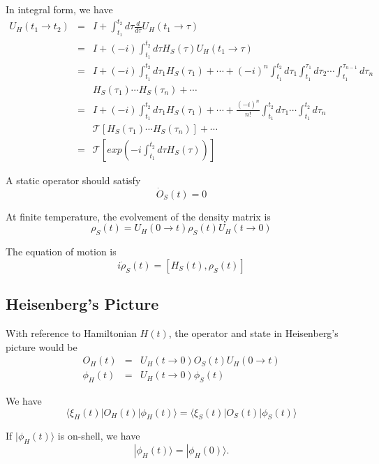 \documentclass[12pt]{book}
\begin{document}
	In integral form, we have
	\begin{eqnarray}
		U_H(t_1\rightarrow t_2)&=& I+\int_{t_1}^{t_2}d\tau\frac d {d\tau} U_H(t_1\rightarrow \tau)\\
		&=& I+(-i)\int_{t_1}^{t_2}d\tau H_S(\tau)U_H(t_1\rightarrow \tau)\\
		&=&I+(-i)\int_{t_1}^{t_2}d\tau_1 H_S(\tau_1)+\cdots+(-i)^n\int_{t_1}^{t_2}d\tau_1\int_{t_1}^{\tau_1}d\tau_2 \cdots\int_{t_1}^{\tau_{n-1}}d\tau_n\nonumber\\
		&& H_S(\tau_1)\cdots H_S(\tau_n)+\cdots\\
		&=&I+(-i)\int_{t_1}^{t_2}d\tau_1 H_S(\tau_1)+\cdots+\frac{(-i)^n}{n!}\int_{t_1}^{t_2}d\tau_1 \cdots\int_{t_1}^{t_2}d\tau_n\nonumber\\
		&& \mathcal T[H_S(\tau_1)\cdots H_S(\tau_n)]+\cdots\\
		&=&\mathcal T[exp(-i\int_{t_1}^{t_2}d\tau H_S(\tau))]
	\end{eqnarray}
	
	A static operator should satisfy
	\begin{equation}
		\dot O_S(t)=0
	\end{equation}	
	
	At finite temperature, the evolvement of the density matrix is
	\begin{equation}
		\rho_S(t)=U_H(0\rightarrow t)\rho_S(t)U_H(t\rightarrow 0)
	\end{equation}
	
	The equation of motion is
	\begin{equation}
		i\dot\rho_S(t)=[H_S(t),\rho_S(t)]
	\end{equation}
	
	\subsection{Heisenberg's Picture}
	With reference to Hamiltonian $H(t)$, the operator and state in Heisenberg's picture would be
	\begin{eqnarray}
		O_H(t)&=&U_H(t\rightarrow 0)O_S(t)U_H(0\rightarrow t)\\
		\phi_H(t)&=&U_H(t\rightarrow 0)\phi_S(t)
	\end{eqnarray}
	
	We have
	\begin{equation}
		\langle \xi_H(t)|O_H(t)|\phi_H(t)\rangle=\langle \xi_S(t)|O_S(t)|\phi_S(t)\rangle
	\end{equation}
	
	If $|\phi_H(t)\rangle$ is on-shell, we have
	\begin{equation}
		|\phi_H(t)\rangle=|\phi_H(0)\rangle.
	\end{equation}	
	
\end{document}
